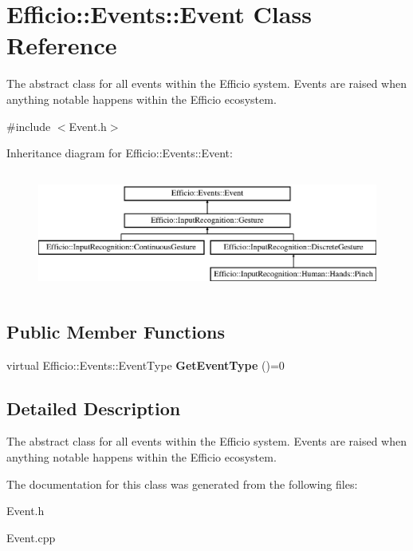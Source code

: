 \hypertarget{class_efficio_1_1_events_1_1_event}{}\section{Efficio\+:\+:Events\+:\+:Event Class Reference}
\label{class_efficio_1_1_events_1_1_event}


The abstract class for all events within the Efficio system. Events are raised when anything notable happens within the Efficio ecosystem.  




{\ttfamily \#include $<$Event.\+h$>$}

Inheritance diagram for Efficio\+:\+:Events\+:\+:Event\+:\begin{figure}[H]
\begin{center}
\leavevmode
\includegraphics[height=4.000000cm]{class_efficio_1_1_events_1_1_event}
\end{center}
\end{figure}
\subsection*{Public Member Functions}
\begin{DoxyCompactItemize}
\item 
\hypertarget{class_efficio_1_1_events_1_1_event_a5758bd5812bfd09e0127892c490d553b}{}\label{class_efficio_1_1_events_1_1_event_a5758bd5812bfd09e0127892c490d553b} 
virtual Efficio\+::\+Events\+::\+Event\+Type {\bfseries Get\+Event\+Type} ()=0
\end{DoxyCompactItemize}


\subsection{Detailed Description}
The abstract class for all events within the Efficio system. Events are raised when anything notable happens within the Efficio ecosystem. 

The documentation for this class was generated from the following files\+:\begin{DoxyCompactItemize}
\item 
Event.\+h\item 
Event.\+cpp\end{DoxyCompactItemize}
